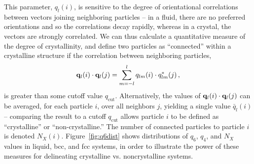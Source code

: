 This parameter, $q_l(i)$, is sensitive to the degree of orientational correlations between vectors joining neighboring particles -- in a fluid, there are no preferred orientations and so the correlations decay rapidly, whereas in a crystal, the vectors are strongly correlated.
We can thus calculate a quantitative measure of the degree of crystallinity, and define two particles as ``connected'' within a crystalline structure if the correlation between neighboring particles,
\begin{equation}
	{\bf q}_l(i)\cdot{\bf q}_l(j) = \sum_{m=-l}^l q_{lm}(i) \cdot q_{lm}^*(j) \,,
	\label{eq:orderparam}
\end{equation}
is greater than some cutoff value $q_{\textrm {cut}}$.
Alternatively, the values of ${\bf q}_l(i) \cdot {\bf q}_l(j)$ can be averaged, for each particle $i$, over all neighbors $j$, yielding a single value $\bar q_l(i)$ -- comparing the result to a cutoff $q_{\textrm {cut}}$ allows particle $i$ to be defined as ``crystalline'' or ``non-crystalline.''
The number of connected particles to particle $i$ is denoted $N_X(i)$.
Figure~\ref{fig:q6dist} shows distributions of $q_6$, $q_4$, and $N_X$ values in liquid, bcc, and fcc systems, in order to illustrate the power of these measures for delineating crystalline vs. noncrystalline systems.

